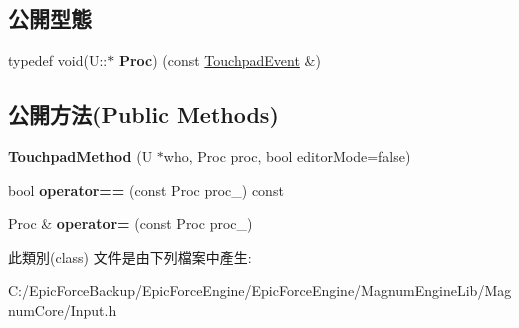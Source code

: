 \subsection*{公開型態}
\begin{DoxyCompactItemize}
\item 
typedef void(U\+::$\ast$ {\bfseries Proc}) (const \hyperlink{class_magnum_1_1_input_1_1_touchpad_event}{Touchpad\+Event} \&)\hypertarget{class_magnum_1_1_input_1_1_touchpad_method_adc34159aebcf7cbcc8a1c4ed83796962}{}\label{class_magnum_1_1_input_1_1_touchpad_method_adc34159aebcf7cbcc8a1c4ed83796962}

\end{DoxyCompactItemize}
\subsection*{公開方法(Public Methods)}
\begin{DoxyCompactItemize}
\item 
{\bfseries Touchpad\+Method} (U $\ast$who, Proc proc, bool editor\+Mode=false)\hypertarget{class_magnum_1_1_input_1_1_touchpad_method_a90a048ad8e2768bea2b7eba15ff909bf}{}\label{class_magnum_1_1_input_1_1_touchpad_method_a90a048ad8e2768bea2b7eba15ff909bf}

\item 
bool {\bfseries operator==} (const Proc proc\+\_\+) const \hypertarget{class_magnum_1_1_input_1_1_touchpad_method_a90d0afc26d1ca98d08b9d8783827f9f0}{}\label{class_magnum_1_1_input_1_1_touchpad_method_a90d0afc26d1ca98d08b9d8783827f9f0}

\item 
Proc \& {\bfseries operator=} (const Proc proc\+\_\+)\hypertarget{class_magnum_1_1_input_1_1_touchpad_method_af27a6290aa60bfff7066a96661ecf9b7}{}\label{class_magnum_1_1_input_1_1_touchpad_method_af27a6290aa60bfff7066a96661ecf9b7}

\end{DoxyCompactItemize}


此類別(class) 文件是由下列檔案中產生\+:\begin{DoxyCompactItemize}
\item 
C\+:/\+Epic\+Force\+Backup/\+Epic\+Force\+Engine/\+Epic\+Force\+Engine/\+Magnum\+Engine\+Lib/\+Magnum\+Core/Input.\+h\end{DoxyCompactItemize}
